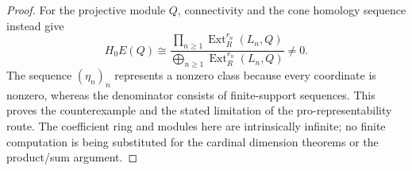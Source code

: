 \begin{proof}
For the projective module $Q$, connectivity and the cone homology sequence instead give
\[
 H_0E(Q)\cong
 \frac{\displaystyle\prod_{n\geq1}
          \operatorname{Ext}^{r_n}_R(L_n,Q)}
      {\displaystyle\bigoplus_{n\geq1}
          \operatorname{Ext}^{r_n}_R(L_n,Q)}\ne0.
\]
The sequence $(\eta_n)_n$ represents a nonzero class because every coordinate is nonzero, whereas the denominator consists of finite-support sequences. This proves the counterexample and the stated limitation of the pro-representability route. The coefficient ring and modules here are intrinsically infinite; no finite computation is being substituted for the cardinal dimension theorems or the product/sum argument.
\end{proof}

